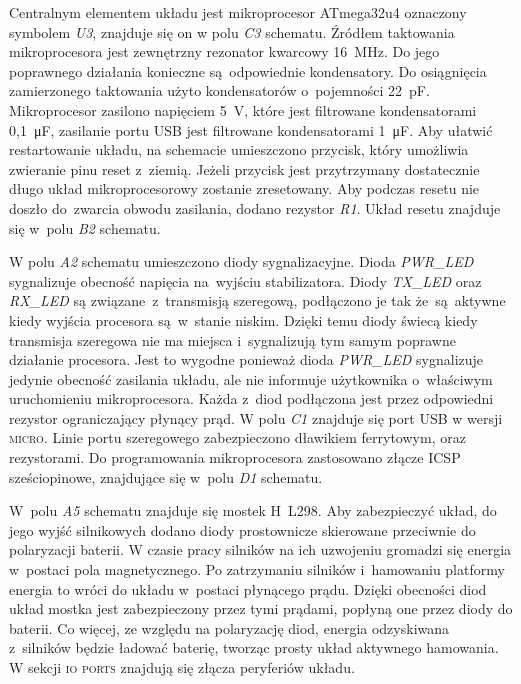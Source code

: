 \documentclass[11pt]{article}
\begin{document}
Centralnym elementem układu jest mikroprocesor ATmega32u4 oznaczony symbolem \textit{U3}, znajduje się on w polu \textit{C3} schematu.
Źródłem taktowania mikroprocesora jest zewnętrzny rezonator kwarcowy 16~\si{\mega\hertz}.
Do jego poprawnego działania konieczne są~odpowiednie kondensatory.
Do osiągnięcia zamierzonego taktowania użyto kondensatorów o~pojemności 22~\si{\pico\farad}.
Mikroprocesor zasilono napięciem 5~\si{\volt}, które jest filtrowane kondensatorami 0,1~\si{\micro\farad}, zasilanie portu USB jest filtrowane kondensatorami 1~\si{\micro\farad}.
Aby ułatwić restartowanie układu, na schemacie umieszczono przycisk, który umożliwia zwieranie pinu reset z~ziemią.
Jeżeli przycisk jest przytrzymany dostatecznie długo układ mikroprocesorowy zostanie zresetowany.
Aby podczas resetu nie doszło do~zwarcia obwodu zasilania, dodano rezystor \textit{R1}.
Układ resetu znajduje się w~polu \textit{B2} schematu.

W polu \textit{A2} schematu umieszczono diody sygnalizacyjne.
Dioda \textit{PWR\_LED} sygnalizuje obecność napięcia na~wyjściu stabilizatora.
Diody \textit{TX\_LED} oraz \textit{RX\_LED} są związane~z~transmisją szeregową, podłączono je tak że~są~aktywne kiedy wyjścia procesora są~w~stanie niskim.
Dzięki temu diody świecą kiedy transmisja szeregowa nie ma miejsca i~sygnalizują tym samym poprawne działanie procesora.
Jest to wygodne ponieważ dioda \textit{PWR\_LED} sygnalizuje jedynie obecność zasilania układu, ale nie informuje użytkownika o~właściwym uruchomieniu mikroprocesora.
Każda z~diod podłączona jest przez odpowiedni rezystor ograniczający płynący prąd.
W polu \textit{C1} znajduje się port USB w wersji \textsc{micro}. Linie portu szeregowego zabezpieczono dławikiem ferrytowym, oraz rezystorami.
Do programowania mikroprocesora zastosowano złącze ICSP sześciopinowe, znajdujące się w~polu \textit{D1} schematu.

W~polu \textit{A5} schematu znajduje się mostek H~L298.
Aby zabezpieczyć układ, do jego wyjść silnikowych dodano diody prostownicze skierowane przeciwnie do polaryzacji baterii.
W czasie pracy silników na ich uzwojeniu gromadzi się energia w~postaci pola magnetycznego.
Po zatrzymaniu silników i~hamowaniu platformy energia to wróci do układu w~postaci płynącego prądu.
Dzięki obecności diod układ mostka jest zabezpieczony przez tymi prądami, popłyną one przez diody do baterii.
 Co więcej, ze względu na polaryzację diod, energia odzyskiwana z~silników będzie ładować baterię, tworząc prosty układ aktywnego hamowania.
W sekcji \textsc{io ports} znajdują się złącza peryferiów układu.
\end{document}
